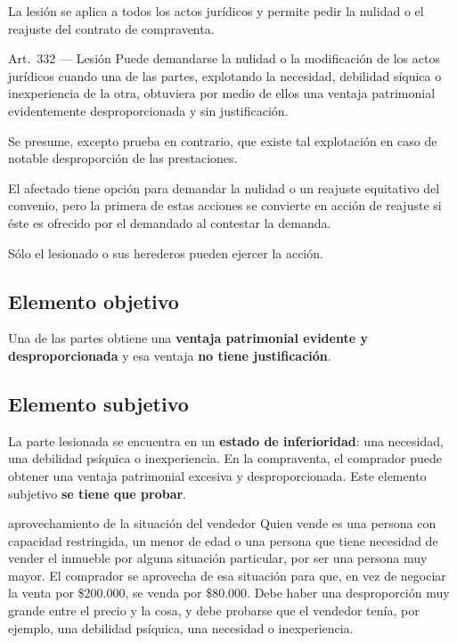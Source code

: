 \documentclass[12pt,oneside]{book}
\begin{document}
La lesi\'on se aplica a todos los actos jur\'idicos y permite pedir la nulidad o el reajuste del contrato de compraventa.

\begin{norma}{Art.~332 --- Lesi\'on}
Puede demandarse la nulidad o la modificaci\'on de los actos jur\'idicos cuando una de las partes, explotando la necesidad, debilidad s\'iquica o inexperiencia de la otra, obtuviera por medio de ellos una ventaja patrimonial evidentemente desproporcionada y sin justificaci\'on.

Se presume, excepto prueba en contrario, que existe tal explotaci\'on en caso de notable desproporci\'on de las prestaciones.

El afectado tiene opci\'on para demandar la nulidad o un reajuste equitativo del convenio, pero la primera de estas acciones se convierte en acci\'on de reajuste si \'este es ofrecido por el demandado al contestar la demanda.

S\'olo el lesionado o sus herederos pueden ejercer la acci\'on.
\end{norma}

\subsection{Elemento objetivo}

Una de las partes obtiene una \textbf{ventaja patrimonial evidente y desproporcionada} y esa ventaja \textbf{no tiene justificaci\'on}.

\subsection{Elemento subjetivo}

La parte lesionada se encuentra en un \textbf{estado de inferioridad}: una necesidad, una debilidad ps\'iquica o inexperiencia. En la compraventa, el comprador puede obtener una ventaja patrimonial excesiva y desproporcionada. Este elemento subjetivo \textbf{se tiene que probar}.

\begin{example}{aprovechamiento de la situaci\'on del vendedor}
Quien vende es una persona con capacidad restringida, un menor de edad o una persona que tiene necesidad de vender el inmueble por alguna situaci\'on particular, por ser una persona muy mayor. El comprador se aprovecha de esa situaci\'on para que, en vez de negociar la venta por \$200.000, se venda por \$80.000. Debe haber una desproporci\'on muy grande entre el precio y la cosa, y debe probarse que el vendedor ten\'ia, por ejemplo, una debilidad ps\'iquica, una necesidad o inexperiencia.
\end{example}
\end{document}
